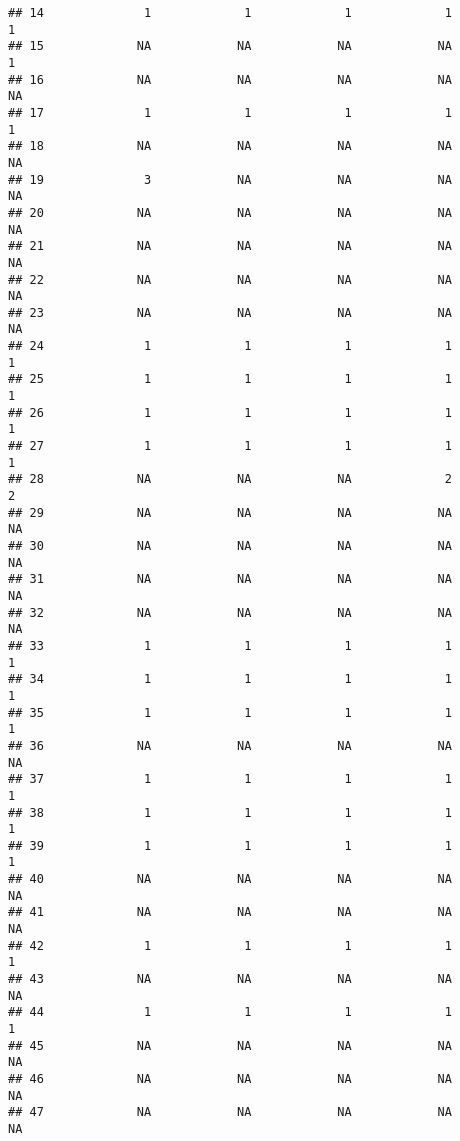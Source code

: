 \documentclass[
]{article}
\begin{document}
\begin{verbatim}
## 14              1             1             1             1             1
## 15             NA            NA            NA            NA             1
## 16             NA            NA            NA            NA            NA
## 17              1             1             1             1             1
## 18             NA            NA            NA            NA            NA
## 19              3            NA            NA            NA            NA
## 20             NA            NA            NA            NA            NA
## 21             NA            NA            NA            NA            NA
## 22             NA            NA            NA            NA            NA
## 23             NA            NA            NA            NA            NA
## 24              1             1             1             1             1
## 25              1             1             1             1             1
## 26              1             1             1             1             1
## 27              1             1             1             1             1
## 28             NA            NA            NA             2             2
## 29             NA            NA            NA            NA            NA
## 30             NA            NA            NA            NA            NA
## 31             NA            NA            NA            NA            NA
## 32             NA            NA            NA            NA            NA
## 33              1             1             1             1             1
## 34              1             1             1             1             1
## 35              1             1             1             1             1
## 36             NA            NA            NA            NA            NA
## 37              1             1             1             1             1
## 38              1             1             1             1             1
## 39              1             1             1             1             1
## 40             NA            NA            NA            NA            NA
## 41             NA            NA            NA            NA            NA
## 42              1             1             1             1             1
## 43             NA            NA            NA            NA            NA
## 44              1             1             1             1             1
## 45             NA            NA            NA            NA            NA
## 46             NA            NA            NA            NA            NA
## 47             NA            NA            NA            NA            NA

\end{verbatim}
\end{document}
